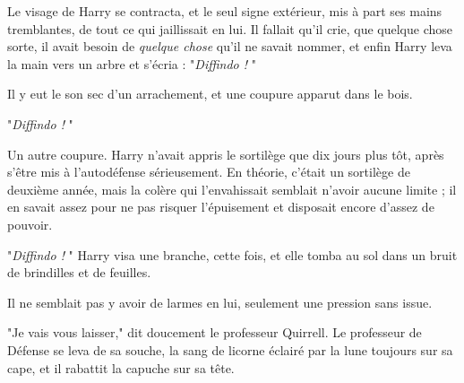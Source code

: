 Le visage de Harry se contracta, et le seul signe extérieur, mis à part ses mains tremblantes, de tout ce qui jaillissait en lui. Il fallait qu'il crie, que quelque chose sorte, il avait besoin de \emph{quelque chose}  qu'il ne savait nommer, et enfin Harry leva la main vers un arbre et s'écria : "\emph{Diffindo !} "

Il y eut le son sec d'un arrachement, et une coupure apparut dans le bois.

"\emph{Diffindo !} "

Un autre coupure. Harry n'avait appris le sortilège que dix jours plus tôt, après s'être mis à l'autodéfense sérieusement. En théorie, c'était un sortilège de deuxième année, mais la colère qui l'envahissait semblait n'avoir aucune limite ; il en savait assez pour ne pas risquer l'épuisement et disposait encore d'assez de pouvoir.

"\emph{Diffindo !} " Harry visa une branche, cette fois, et elle tomba au sol dans un bruit de brindilles et de feuilles.

Il ne semblait pas y avoir de larmes en lui, seulement une pression sans issue.

"Je vais vous laisser," dit doucement le professeur Quirrell. Le professeur de Défense se leva de sa souche, la sang de licorne éclairé par la lune toujours sur sa cape, et il rabattit la capuche sur sa tête.

